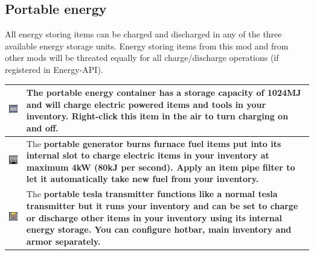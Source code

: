 \documentclass[11pt]{article} %
\makeatletter
\newcommand{\imgtex}{\begin{tabularx}{\textwidth}{@{}c@{ }X@{}}}
\makeatother
\begin{document}
\subsection{Portable energy}
All energy storing items can be charged and discharged in any of the three available energy storage units. Energy storing items from this mod and from other mods will be threated equally for all charge/discharge operations (if registered in Energy-API).\\
\imgtex
\includegraphics[align = t]{itemPortableEnergy} & The \bf portable energy container \rm has a storage capacity of 1024MJ and will charge electric powered items and tools in your inventory. Right-click this item in the air to turn charging on and off. \\ \hline
\includegraphics[align = t]{itemPortableGenerator} & The \bf portable generator \rm burns furnace fuel items put into its internal slot to charge electric items in your inventory at maximum 4kW (80kJ per second). Apply an item pipe filter to let it automatically take new fuel from your inventory. \\ \hline
\includegraphics[align = t]{itemTeslaTransmitter} & The \bf portable tesla transmitter \rm functions like a normal \bf tesla transmitter \rm but it runs your inventory and can be set to charge or discharge other items in your inventory using its internal energy storage. You can configure hotbar, main inventory and armor separately.
\end{tabularx}
\end{document}
